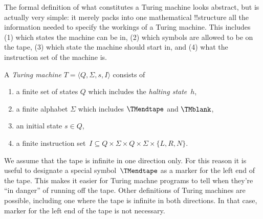\documentclass[../../include/open-logic-section]{subfiles}
\begin{document}

\begin{explain}
The formal definition of what constitutes a Turing machine looks
abstract, but is actually very simple: it merely packs into one
mathematical !!{structure} all the information needed to specify the
workings of a Turing machine. This includes (1) which states the
machine can be in, (2) which symbols are allowed to be on the tape, (3)
which state the machine should start in, and (4) what the instruction
set of the machine is.
\end{explain}

\begin{defn}
A \emph{Turing machine} $T = \langle Q, \Sigma, s, I\rangle$ consists of
\begin{enumerate}
\item a finite set of states $Q$ which includes the \emph{halting state}~$h$,
\item a finite alphabet $\Sigma$ which includes $\TMendtape$ and
  $\TMblank$,
\item an initial state $s \in Q$,
\item a finite instruction set~$I \subseteq Q \times \Sigma \times Q
  \times \Sigma \times \{L, R, N\}$.
\end{enumerate}
\end{defn}

\begin{explain}
We assume that the tape is infinite in one direction only. For this
reason it is useful to designate a special symbol~$\TMendtape$ as
a marker for the left end of the tape.  This makes it easier for
Turing machne programs to tell when they're ``in danger'' of running
off the tape.  Other definitions of Turing machines are possible,
including one where the tape is infinite in both directions. In that
case, marker for the left end of the tape is not necessary.
\end{explain}
\end{document}
